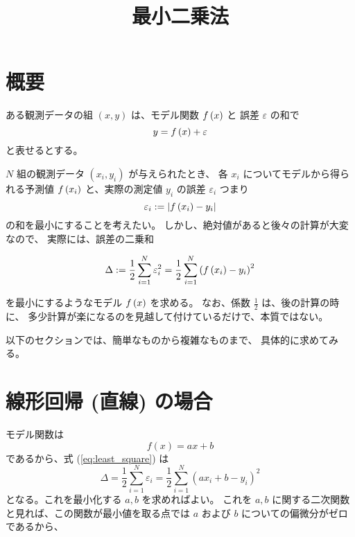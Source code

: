 \documentclass[12pt]{jsarticle}
\title{最小二乗法}
\def\error{\varepsilon}
\def\sumdata{\sum_{i=1}^{N}}
\begin{document}
\maketitle

\section{概要}
ある観測データの組 $(x, y)$ は、モデル関数 $f \left( x \right)$ と
誤差 $\varepsilon$ の和で
\begin{equation}
  y = \function{f}{x} + \error
\end{equation}
と表せるとする。

$N$ 組の観測データ $(x_i, y_i)$ が与えられたとき、
各 $x_i$ についてモデルから得られる予測値
$f \left( x_i \right)$ と、実際の測定値 $y_i$ の誤差 $\error_i$ つまり
\begin{equation}
  \error_i := \left| \function{f}{x_i} - y_i \right|
\end{equation}
の和を最小にすることを考えたい。
しかし、絶対値があると後々の計算が大変なので、
実際には、誤差の二乗和

\begin{equation}
  \Delta := \frac{1}{2} \sumdata \error_i^2 = \frac{1}{2} \sumdata
  \left( \function{f}{x_i} - y_i \right)^2 \label{eq:least_square}
\end{equation}

を最小にするようなモデル $f \left( x \right)$ を求める。
なお、係数 $\frac{1}{2}$ は、後の計算の時に、
多少計算が楽になるのを見越して付けているだけで、本質ではない。

以下のセクションでは、簡単なものから複雑なものまで、
具体的に求めてみる。

\section{線形回帰 (直線) の場合}

モデル関数は
\begin{equation}
  f \left( x \right) = a x + b
\end{equation}
であるから、式 (\ref{eq:least_square}) は
\begin{equation}
  \Delta = \frac{1}{2} \sumdata \error_i = \frac{1}{2}
  \sumdata \left( a x_i + b - y_i \right) ^2
\end{equation}
となる。これを最小化する $a, b$ を求めればよい。
これを $a, b$ に関する二次関数と見れば、この関数が最小値を取る点では
$a$ および $b$ についての偏微分がゼロであるから、
\end{document}
